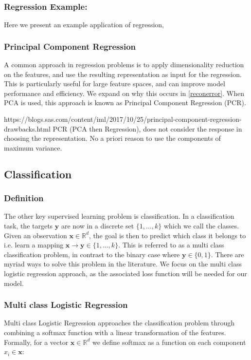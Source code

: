 \subsubsection{Regression Example: }
Here we present an example application of regression, 



\subsubsection{Principal Component Regression}
A common approach in regression problems is to apply dimensionality reduction on the features, and use the resulting representation as input for the regression. This is particularly useful for large feature spaces, and can improve model performance and efficiency. We expand on why this occurs in \ref{reconerror}. When PCA is used, this approach is known as Principal Component Regression (PCR). 


https://blogs.sas.com/content/iml/2017/10/25/principal-component-regression-drawbacks.html
PCR (PCA then Regression), does not consider the response in choosing the representation. No a priori reason to use the components of maximum variance.

\subsection{Classification}
\subsubsection{Definition}
The other key supervised learning problem is classification. In a classification task, the targets $\mathbf{y}$ are now in a discrete set $\{1, ..., k\}$ which we call the classes. Given an observation $\mathbf{x} \in \mathbb{R}^{d}$, the goal is then to predict which class it belongs to i.e. learn a mapping $\mathbf{x} \to \mathbf{y} \in \{1, ..., k\}$. This is referred to as a multi class classification problem, in contrast to the binary case where $\mathbf{y} \in \{0,1\}$. There are myriad ways to solve this problem in the literature. We focus on the multi class logistic regression approach, as the associated loss function will be needed for our model. 

\subsubsection{Multi class Logistic Regression}
Multi class Logistic Regression approaches the classification problem through combining a softmax function with a linear transformation of the features. Formally, for a vector $\mathbf{x}\in \mathbb{R}^d$ we define softmax as a function on each component $x_i \in \mathbf{x}$:


